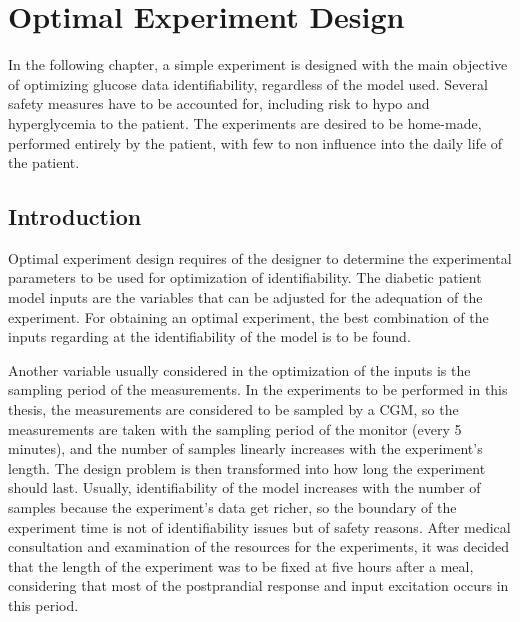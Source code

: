 \chapter{Optimal Experiment Design}
\label{sec:OptimalDesign}

In the following chapter, a simple experiment is designed with the main objective of optimizing glucose data identifiability, regardless of the model used. Several safety measures have to be accounted for, including risk to hypo and hyperglycemia to the patient. The experiments are desired to be home-made, performed entirely by the patient, with few to non influence into the daily life of the patient.

\section{Introduction}
\label{sec:Introductionoptext}

Optimal experiment design requires of the designer to determine the experimental parameters to be used for optimization of identifiability. The diabetic patient model inputs are the variables that can be adjusted for the adequation of the experiment. For obtaining an optimal experiment, the best combination of the inputs regarding at the identifiability of the model is to be found.

Another variable usually considered in the optimization of the inputs is the sampling period of the measurements. In the experiments to be performed in this thesis, the measurements are considered to be sampled by a CGM, so the measurements are taken with the sampling period of the monitor (every 5 minutes), and the number of samples linearly increases with the experiment's length. The design problem is then transformed into how long the experiment should last. Usually, identifiability of the model increases with the number of samples because the experiment's data get richer, so the boundary of the experiment time is not of identifiability issues but of safety reasons. After medical consultation and examination of the resources for the experiments, it was decided that the length of the experiment was to be fixed at five hours after a meal, considering that most of the postprandial response and input excitation occurs in this period.

